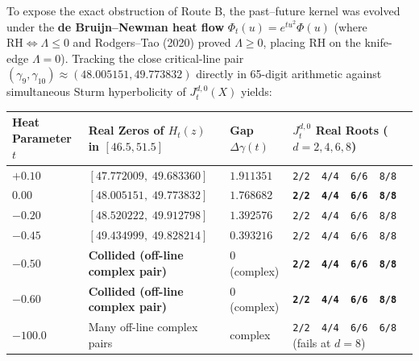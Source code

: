 \documentclass[
  11pt,
]{article}
\newcounter{none} %
\begin{document}
To expose the exact obstruction of Route B, the past--future kernel was
evolved under the \textbf{de Bruijn--Newman heat flow}
\(\Phi_t(u) = e^{t u^2}\Phi(u)\) (where
\(\mathrm{RH} \iff \Lambda \le 0\) and Rodgers--Tao (2020) proved
\(\Lambda \ge 0\), placing RH on the knife-edge \(\Lambda = 0\)).
Tracking the close critical-line pair
\((\gamma_9, \gamma_{10}) \approx (48.005151, 49.773832)\) directly in
65-digit arithmetic against simultaneous Sturm hyperbolicity of
\(J_t^{d,0}(X)\) yields:

{\def\LTcaptype{none} %
\begin{longtable}[]{@{}
  >{\centering\arraybackslash}p{}
  >{\centering\arraybackslash}p{}
  >{\centering\arraybackslash}p{}
  >{\centering\arraybackslash}p{}@{}}
\toprule\noalign{}
\begin{minipage}[b]{\linewidth}\centering
Heat Parameter \(t\)
\end{minipage} & \begin{minipage}[b]{\linewidth}\centering
Real Zeros of \(H_t(z)\) in \([46.5, 51.5]\)
\end{minipage} & \begin{minipage}[b]{\linewidth}\centering
Gap \(\Delta\gamma(t)\)
\end{minipage} & \begin{minipage}[b]{\linewidth}\centering
\(J_t^{d,0}\) Real Roots (\(d = 2, 4, 6, 8\))
\end{minipage} \\
\midrule\noalign{}
\endhead
\bottomrule\noalign{}
\endlastfoot
\(+0.10\) & \([47.772009,\; 49.683360]\) & \(1.911351\) &
\texttt{2/2\ \ 4/4\ \ 6/6\ \ 8/8} \\
\textbf{\(0.00\)} & \textbf{\([48.005151,\; 49.773832]\)} &
\textbf{\(1.768682\)} & \textbf{\texttt{2/2\ \ 4/4\ \ 6/6\ \ 8/8}} \\
\(-0.20\) & \([48.520222,\; 49.912798]\) & \(1.392576\) &
\texttt{2/2\ \ 4/4\ \ 6/6\ \ 8/8} \\
\(-0.45\) & \([49.434999,\; 49.828214]\) & \(0.393216\) &
\texttt{2/2\ \ 4/4\ \ 6/6\ \ 8/8} \\
\textbf{\(-0.50\)} & \textbf{Collided (off-line complex pair)} & \(0\)
(complex) & \textbf{\texttt{2/2\ \ 4/4\ \ 6/6\ \ 8/8}} \\
\textbf{\(-0.60\)} & \textbf{Collided (off-line complex pair)} & \(0\)
(complex) & \textbf{\texttt{2/2\ \ 4/4\ \ 6/6\ \ 8/8}} \\
\(-100.0\) & Many off-line complex pairs & complex &
\texttt{2/2\ \ 4/4\ \ 6/6\ \ 6/8} (fails at \(d=8\)) \\
\end{longtable}
}
\end{document}
